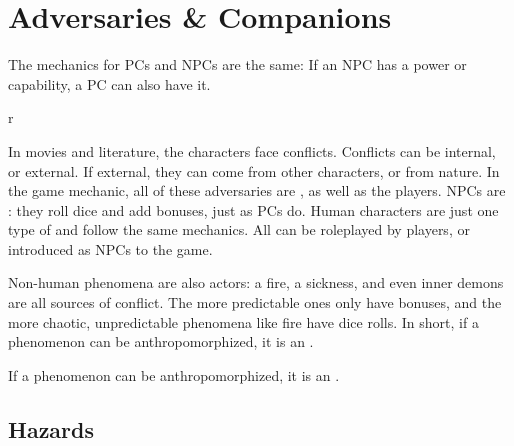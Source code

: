 \chapterspaceabove{6.75cm}
\chapterspacebelow{11.25cm}


\chapter{Adversaries \& Companions}

\begin{emphasisParagraph}
	The mechanics for PCs and NPCs are the same: If an NPC has a power or capability,
	a PC can also have it.
\end{emphasisParagraph}


\begin{wrapfigure}{r}{}
\end{wrapfigure}


In movies and literature, the characters face conflicts.
Conflicts can be internal, or external.
If external, they can come from other characters, or from nature.
In the game mechanic, all of these adversaries are , as well as the players.
NPCs are : they roll dice and add bonuses, just as PCs do.
Human characters are just one type of  and follow the same mechanics.
All  can be roleplayed by players, or introduced as NPCs to the game.

Non-human phenomena are also actors: a fire, a sickness, and even inner demons are all
sources of conflict. The more predictable ones only have bonuses, and the more
chaotic, unpredictable phenomena like fire have dice rolls.
In short, if a phenomenon can be anthropomorphized, it is an .

\begin{emphasisParagraph}
	If a phenomenon can be anthropomorphized, it is an .
\end{emphasisParagraph}



\section{Hazards}

